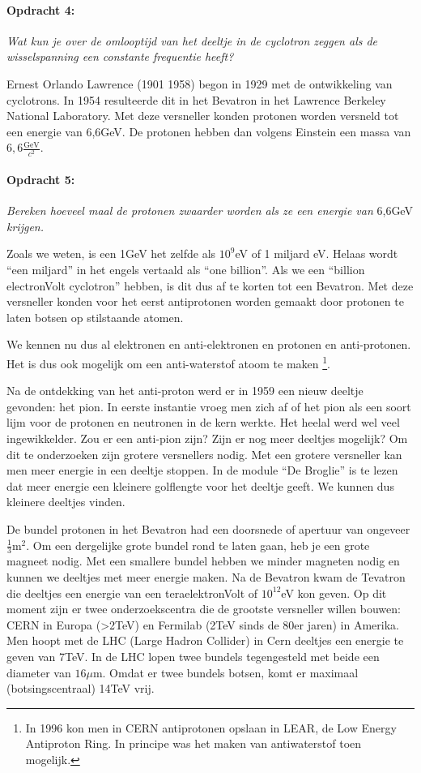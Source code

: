 \paragraph*{Opdracht 4:}

\emph{Wat kun je over de omlooptijd van het deeltje in de cyclotron
zeggen als de wisselspanning een constante frequentie heeft?}

Ernest Orlando Lawrence (1901 \textendash{} 1958) begon in 1929 met
de ontwikkeling van cyclotrons. In 1954 resulteerde dit in het Bevatron
in het Lawrence Berkeley National Laboratory. Met deze versneller
konden protonen worden versneld tot een energie van 6,6GeV. De protonen
hebben dan volgens Einstein een massa van $6,6\frac{\mathrm{GeV}}{c^{2}}$. 


\paragraph*{Opdracht 5:}

\emph{Bereken hoeveel maal de protonen zwaarder worden als ze een
energie van }6,6GeV\emph{ krijgen.}

Zoals we weten, is een 1GeV het zelfde als $10^{9}$eV of 1 miljard
eV. Helaas wordt ``een miljard'' in het engels vertaald als ``one
billion''. Als we een ``billion electronVolt cyclotron'' hebben,
is dit dus af te korten tot een Bevatron. Met deze versneller konden
voor het eerst antiprotonen worden gemaakt door protonen te laten
botsen op stilstaande atomen. 

We kennen nu dus al elektronen en anti-elektronen en protonen en
anti-protonen. Het is dus ook mogelijk om een anti-waterstof atoom te
maken \footnote{In 1996 kon men in CERN antiprotonen opslaan in LEAR, de
Low Energy Antiproton Ring. In principe was het maken van antiwaterstof
toen mogelijk.}. 

Na de ontdekking van het anti-proton werd er in 1959 een nieuw deeltje
gevonden: het pion. In eerste instantie vroeg men zich af of het pion
als een soort lijm voor de protonen en neutronen in de kern werkte.
Het heelal werd wel veel ingewikkelder. Zou er een anti-pion zijn?
Zijn er nog meer deeltjes mogelijk? Om dit te onderzoeken zijn grotere
versnellers nodig. Met een grotere versneller kan men meer energie
in een deeltje stoppen. In de module ``De Broglie'' is te lezen
dat meer energie een kleinere golflengte voor het deeltje geeft. We
kunnen dus kleinere deeltjes vinden.

De bundel protonen in het Bevatron had een doorsnede of apertuur van
ongeveer $\frac{1}{3}\mathrm{m}^{2}$. Om een dergelijke grote bundel
rond te laten gaan, heb je een grote magneet nodig. Met een smallere
bundel hebben we minder magneten nodig en kunnen we deeltjes met meer
energie maken. Na de Bevatron kwam de Tevatron die deeltjes een energie
van een teraelektronVolt of $10^{12}$eV kon geven. Op dit moment
zijn er twee onderzoekscentra die de grootste versneller willen bouwen:
CERN in Europa (>2TeV) en Fermilab (2TeV sinds de 80er jaren) in Amerika.
Men hoopt met de LHC (Large Hadron Collider) in Cern deeltjes een
energie te geven van 7TeV. In de LHC lopen twee bundels tegengesteld
met beide een diameter van $16\mu\mathrm{m}$. Omdat er twee bundels
botsen, komt er maximaal (botsingscentraal) 14TeV vrij.



